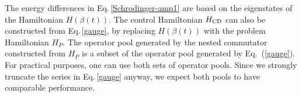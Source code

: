 \documentclass[twocolumn,aps,superscriptaddress,floatfix,longbibliography]{revtex4-2}
\newcommand{\awc}[1]{{\color[rgb]{.8,.6,.6}{[AW: {\it #1}\,]}}}
\newcommand{\Eq}[1]{Eq.\,\eqref{#1}}
\begin{document}

The energy differences in \Eq{Schrodinger-amp1} are based on the
eigenstates of the Hamiltonian $H(\beta(t))$.  The control
Hamiltonian $H_{\rm CD}$ can also be constructed from
\Eq{gauge}, by replacing $H(\beta(t))$ with the problem
Hamiltonian $H_P$.  The operator pool generated by the nested
commutator constructed from $H_P$ is a subset of the operator
pool generated by Eq.~(\ref{gauge}). For practical purposes, one
can use both sets of operator pools. Since we strongly truncate
the series in \Eq{gauge} anyway, we expect both pools to have
comparable performance. 




\end{document}
